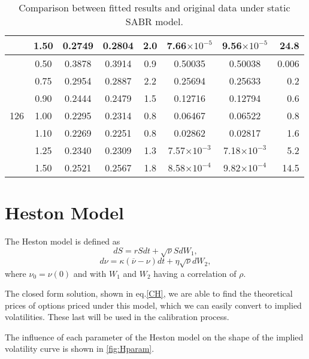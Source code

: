\begin{table}[H]
\begin{tabular}{@{}lccccccr@{}}
&1.50 & 0.2749 & 0.2804 & 2.0 & 7.66$\times10^{-5}$ & 9.56$\times10^{-5}$ & 24.8 \\\midrule
\multirow{7}{*}{126} &0.50 & 0.3878 & 0.3914 & 0.9 & 0.50035 & 0.50038 & 0.006 \\
&0.75 & 0.2954 & 0.2887 & 2.2 & 0.25694 & 0.25633 & 0.2 \\
&0.90 & 0.2444 & 0.2479 & 1.5 & 0.12716 & 0.12794 & 0.6 \\
&1.00 & 0.2295 & 0.2314 & 0.8 & 0.06467 & 0.06522 & 0.8 \\
&1.10 & 0.2269 & 0.2251 & 0.8 & 0.02862 & 0.02817 & 1.6 \\
&1.25 & 0.2340 & 0.2309 & 1.3 & 7.57$\times10^{-3}$ & 7.18$\times10^{-3}$ & 5.2 \\
&1.50 & 0.2521 & 0.2567 & 1.8 & 8.58$\times10^{-4}$ & 9.82$\times10^{-4}$ & 14.5 \\
 \bottomrule
\end{tabular}
  \caption[Comparison between fitted results and original data under static SABR model.]{Comparison between fitted results and original data under static SABR model.}
  \label{tab:SS}
\end{table}







\newpage
\section{Heston Model}
The Heston model is defined as
\begin{equation}
dS=rSdt+\sqrt{\nu}SdW_1,
\end{equation}
\begin{equation}
d\nu=\kappa(\overline{\nu}-\nu)dt+\eta\sqrt{\nu}dW_2,
\end{equation}
\noindent where $\nu_0=\nu(0)$ and with $W_1$ and $W_2$ having a correlation of $\rho$.

The closed form solution, shown in eq.\eqref{CH}, we are able to find the theoretical prices of options priced under this model, which we can easily convert to implied volatilities. These last will be used in the calibration process.

The influence of each parameter of the Heston model on the shape of the implied volatility curve is shown in \autoref{fig:Hparam}.


